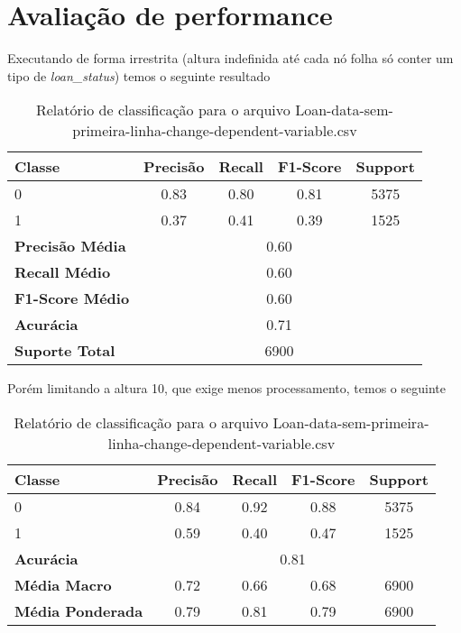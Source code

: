 \documentclass[12pt]{article}
\begin{document}
\section{Avaliação de performance}
Executando de forma irrestrita (altura indefinida até cada nó folha só conter um tipo de \textit{loan\_status}) temos o seguinte resultado
\begin{table}[h]
	\centering
	\begin{tabular}{lcccc}
		\hline
		\textbf{Classe} & \textbf{Precisão} & \textbf{Recall} & \textbf{F1-Score} & \textbf{Support} \\ \hline
		0                & 0.83              & 0.80               & 0.81               & 5375              \\
		1                & 0.37              & 0.41               & 0.39               & 1525              \\ \hline
		\textbf{Precisão Média} & \multicolumn{4}{c}{0.60} \\
		\textbf{Recall Médio} & \multicolumn{4}{c}{0.60} \\
		\textbf{F1-Score Médio} & \multicolumn{4}{c}{0.60} \\
		\textbf{Acurácia} & \multicolumn{4}{c}{0.71} \\
		\textbf{Suporte Total} & \multicolumn{4}{c}{6900} \\ \hline
	\end{tabular}
	\caption{Relatório de classificação para o arquivo Loan-data-sem-primeira-linha-change-dependent-variable.csv}
	\label{tab:class_report}
\end{table}

Porém limitando a altura 10, que exige menos processamento, temos o seguinte

\begin{table}[h]
	\centering
	\begin{tabular}{lcccc}
		\hline
		\textbf{Classe} & \textbf{Precisão} & \textbf{Recall} & \textbf{F1-Score} & \textbf{Support} \\ \hline
		0                & 0.84              & 0.92               & 0.88               & 5375              \\
		1                & 0.59              & 0.40               & 0.47               & 1525              \\ \hline
		\textbf{Acurácia} & \multicolumn{4}{c}{0.81} \\
		\textbf{Média Macro} & 0.72 & 0.66 & 0.68 & 6900 \\
		\textbf{Média Ponderada} & 0.79 & 0.81 & 0.79 & 6900 \\ \hline
	\end{tabular}
	\caption{Relatório de classificação para o arquivo Loan-data-sem-primeira-linha-change-dependent-variable.csv}
	\label{tab:class_report}
\end{table}
\end{document}
